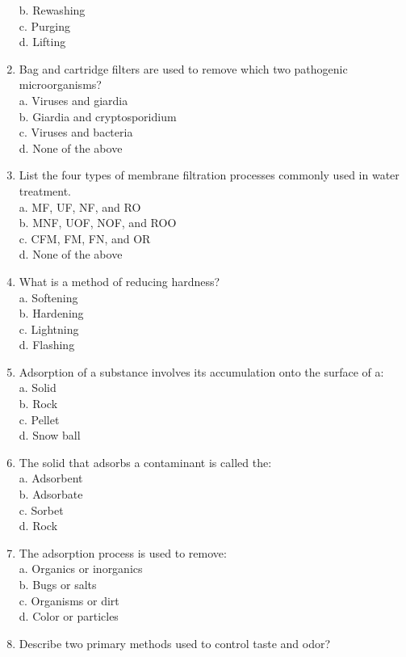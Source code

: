\begin{enumerate}
b. Rewashing\\
c. Purging\\
d. Lifting\\
\item Bag and cartridge filters are used to remove which two pathogenic microorganisms?\\
a. Viruses and giardia\\
b. Giardia and cryptosporidium\\
c. Viruses and bacteria\\
d. None of the above\\
\item List the four types of membrane filtration processes commonly used in water treatment.\\
a. MF, UF, NF, and RO\\
b. MNF, UOF, NOF, and ROO\\
c. CFM, FM, FN, and OR\\
d. None of the above\\
\item What is a method of reducing hardness?\\
a. Softening\\
b. Hardening\\
c. Lightning\\
d. Flashing\\
\item Adsorption of a substance involves its accumulation onto the surface of a:\\
a. Solid\\
b. Rock\\
c. Pellet\\
d. Snow ball\\
\item The solid that adsorbs a contaminant is called the:\\
a. Adsorbent\\
b. Adsorbate\\
c. Sorbet\\
d. Rock\\
\item The adsorption process is used to remove:\\
a. Organics or inorganics\\
b. Bugs or salts\\
c. Organisms or dirt\\
d. Color or particles\\
\item Describe two primary methods used to control taste and odor?\\

\end{enumerate}
